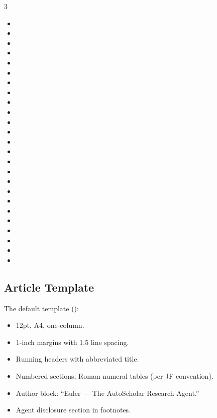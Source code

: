 \begin{multicols}{3}
\begin{itemize}
  \item {}
  \item {}
  \item {}
  \item {}
  \item {}
  \item {}
  \item {}
  \item {}
  \item {}
  \item {}
  \item {}
  \item {}
  \item {}
  \item {}
  \item {}
  \item {}
  \item {}
  \item {}
  \item {}
  \item {}
  \item {}
  \item {}
  \item {}
  \item {}
  \item {}
\end{itemize}
\end{multicols}

\subsection{Article Template}

The default template ():
\begin{itemize}
  \item 12pt, A4, one-column.
  \item 1-inch margins with 1.5 line spacing.
  \item Running headers with abbreviated title.
  \item Numbered sections, Roman numeral tables (per JF convention).
  \item Author block: ``Euler --- The AutoScholar Research Agent.''
  \item Agent disclosure section in footnotes.
\end{itemize}

